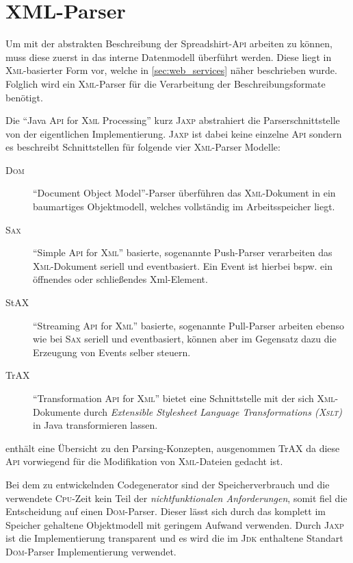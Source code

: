 \section{XML-Parser}
\label{sec:xml_parser}

Um mit der abstrakten Beschreibung der Spreadshirt-\textsc{Api} arbeiten zu können, muss diese zuerst in das interne Datenmodell überführt werden. Diese liegt in \textsc{Xml}-basierter Form vor, welche in \cref{sec:web_services} näher beschrieben wurde. Folglich wird ein \textsc{Xml}-Parser für die Verarbeitung der Beschreibungsformate benötigt.  

Die \enquote{Java \textsc{Api} for \textsc{Xml} Processing} kurz \textsc{Jaxp} abstrahiert die Parserschnittstelle von der eigentlichen Implementierung. \textsc{Jaxp} ist dabei keine einzelne \textsc{Api} sondern es beschreibt Schnittstellen für folgende vier \textsc{Xml}-Parser Modelle:

\begin{description}
    \item[\textsc{Dom}] \enquote{Document Object Model}-Parser überführen das \textsc{Xml}-Dokument in ein baumartiges Objektmodell, welches vollständig im Arbeitsspeicher liegt.
    \item[\textsc{Sax}] \enquote{Simple \textsc{Api} for \textsc{Xml}} basierte, sogenannte Push-Parser verarbeiten das \textsc{Xml}-Dokument seriell und eventbasiert. Ein Event ist hierbei bspw. ein öffnendes oder schließendes Xml-Element.
    \item[StAX] \enquote{Streaming \textsc{Api} for \textsc{Xml}} basierte, sogenannte Pull-Parser arbeiten ebenso wie bei \textsc{Sax} seriell und eventbasiert, können aber im Gegensatz dazu die Erzeugung von Events selber steuern. 
    \item[TrAX] \enquote{Transformation \textsc{Api} for \textsc{Xml}} bietet eine Schnittstelle mit der sich \textsc{Xml}-Dokumente durch \emph{Extensible Stylesheet Language Transformations (\textsc{Xslt})} in Java transformieren lassen.
\end{description}

 enthält eine Übersicht zu den Parsing-Konzepten, ausgenommen TrAX da diese \textsc{Api} vorwiegend für die Modifikation von \textsc{Xml}-Dateien gedacht ist.

Bei dem zu entwickelnden Codegenerator sind der Speicherverbrauch und die verwendete \textsc{Cpu}-Zeit kein Teil der \emph{nichtfunktionalen Anforderungen}, somit fiel die Entscheidung auf einen \textsc{Dom}-Parser. Dieser lässt sich durch das komplett im Speicher gehaltene Objektmodell mit geringem Aufwand verwenden. Durch \textsc{Jaxp} ist die Implementierung transparent und es wird die im \textsc{Jdk} enthaltene Standart \textsc{Dom}-Parser Implementierung verwendet.


